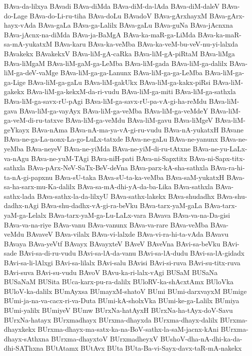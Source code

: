 {BAva-da-lilxya
BAvadi
BAva-diMda
BAva-diM-da-lAda
BAva-diM-daleV
BAva-do-Lage
BAva-do-Li-ru-tiha
BAva-doLu
BAvadoV
BAva-gArxhayxM
BAva-gArx-hayx-vAda
BAva-gaLa
BAva-ga-Lalilx
BAva-gaLu
BAva-guNa
BAva-jAcnxna
BAva-jAcnx-na-diMda
BAva-ja-BaMgA
BAva-ka-maR-ga-LiMda
BAva-ka-maR-sa-mA-yukatxM
BAva-karu
BAva-ka-veMba
BAva-ka-veM-bu-veV-nu-yi-lalxda
BAvakekx
BAvakekxV
BAva-liM-gA-caRka
BAva-liM-gA-piRtaM
BAva-liMga
BAva-liMgaM
BAva-liM-gaM-ga-LeMba
BAva-liM-gada
BAva-liM-ga-dalilx
BAva-liM-ga-deV-vaMge
BAva-liM-ga-ga-Lanunx
BAva-liM-ga-ga-LeMba
BAva-liM-ga-ga-Lige
BAva-liM-ga-gaLu
BAva-liM-gakUkx
BAva-liM-ga-kakx-piRsi
BAva-liM-gakekx
BAva-liM-ga-kekxM-da-ri-vudu
BAva-liM-ga-miti
BAva-liM-ga-sathxla
BAva-liM-ga-savx-rU-pAgi
BAva-liM-ga-savx-rU-pa-vA-gi-ha-reMdu
BAva-liM-gava
BAva-liM-ga-vayAyx
BAva-liM-ga-veMba
BAva-liM-ga-veMdeY
BAva-liM-ga-veM-di-ru-tatxve
BAva-liM-ga-veMdu
BAva-liM-gavu
BAva-liMgeV
BAva-liM-geYkayx
BAva-nAma
BAva-nA-ma-ya-vA-gi-ru-vudu
BAva-nA-yukatxH
BAvane
BAva-ne-ga-La-nonx-La-go-LuLx-tatxde
BAva-ne-gaLu
BAva-ne-yanunx
BAva-ne-yeMba
BAva-neyeV
BAva-ne-yiMda
BAva-ne-yiM-di-ru-tAtxne
BAva-ne-yu-LaLx-va-nAgu
BAva-ne-yuM-TAgi
BAva-niH-pati
BAva-ni-Sapxtitx
BAva-ni-Sapx-titx-sathxla
BAva-pArx-NeV-SaTx-BeV-deVna
BAva-parx-kA-sha-sathxla
BAva-ra-hi-ta-nA-gi-papxnu
BAva-sU-taka
BAva-sU-ta-ka-veMba
BAva-saM-yukatxH
BAva-sa-ha-sarx-mu-Ka-dalilx
BAva-sa-mA-dhi-yA-da-ba-Lika
BAva-sathxla
BAva-sathx-lada
BAva-sathx-la-da-lilxyU
BAva-sathx-lakekx
BAva-shudadhx
BAva-shu-dadhx-nAgi
BAva-shu-dadhx-vA-gi-ra-beVku
BAva-tarx-yaM-gaLa
BAva-tarx-yaM-ga-Lelalx
BAva-tarx-yaM-ga-Lu-LaLx-vara
BAvava
BAva-va-na-Da-gisi
BAva-va-na-riye
BAva-vanu
BAva-vanunx
BAva-va-rare
BAva-veMba
BAva-veMdu
BAvaveV
BAva-vilalx
BAva-vi-lalxde
BAva-vi-ra-hi-ta-vAda
BAvavu
BAvaya
BAva-yeVtf
BAvayx
BAvayxteV
BAveV
BAveVna
BAvi-sa-beVku
BAvi-sade
BAvi-sa-di-ru-vudu
BAvi-sa-lA-da-vanu
BAvi-sa-lA-dudu
BAvi-sa-lA-gidadx
BAvi-sa-li-lAlxgi
BAvi-sa-lilalx
BAvi-salu
BAvisi
BAvi-si-ruva
BAvi-su-titx-ruva
BAvi-suva
BAvi-su-vudu
BAvoV
BAvu-ka-ri-lalx-vAgi
BUSaM
BUSaNa
BUSaNaM
BUSita
BUca-karx-pu-ra-dalilx
BUloRV-ka-shAcxtAmx
BUloVka
BUloV-ka-dalilx
BUmAyxsa
BUmayxM-shatoV
BUmi
BUmi-darxvayxM
BUmige
BUmi-ja-na-va-cacx-ri-va-Duta
BUmi-kA-sholxVka
BUmi-ke-ga-Lalilx
BUmiya
BUmi-yalilx
BUmiyeV
BUmw
BUrxNa-hatAyxH
BUrxNa-ha-tAyx-doV-Savu
BUrxNa-hatayx
BUrxmadhayx
BUrxma-dhayxda
BUrxma-dhayx-dalilx
BUrxma-dhayxkekx
BUrxma-dhayx-ma-satx-ka-na-BoV-sathx-la-saM-jacnx-kAni
BUrxma-dhayx-sAthxna
BUrxma-dhayxtoV
BUrxmadheyxV
BUshoV-dha-nA-dhi-ka-da-dhi-SAThxna
BUtAtamx
BUtAvx
BUta
BUta-Ba-vi-Sayx-davx-taR-mA-nakekx
}
